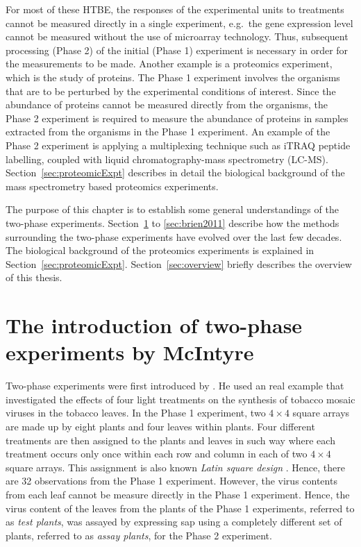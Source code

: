 \documentclass[11pt,a4paper]{article}
\begin{document}

For most of these HTBE, the responses of the experimental units to treatments cannot be measured directly in a single experiment, e.g.\ the gene expression level cannot be measured without the use of microarray technology. Thus, subsequent processing (Phase 2) of the initial (Phase 1) experiment is necessary in order for the measurements to be made. Another example is a proteomics experiment, which is the study of proteins. The Phase 1 experiment involves the organisms that are to be perturbed by the experimental conditions of interest. Since the abundance of proteins cannot be measured directly from the organisms, the Phase 2 experiment is required to measure the abundance of proteins in samples extracted from the organisms in the Phase 1 experiment. An example of the Phase 2 experiment is applying a multiplexing technique such as iTRAQ peptide labelling, coupled with liquid chromatography-mass spectrometry (LC-MS). Section~\ref{sec:proteomicExpt} describes in detail the biological background of the mass spectrometry based proteomics experiments. 

The purpose of this chapter is to establish some general understandings of the two-phase experiments. Section~\ref{sec:introTwoPhase} to \ref{sec:brien2011} describe how the methods surrounding the two-phase experiments have evolved over the last few decades. The biological background of the proteomics experiments is explained in Section~\ref{sec:proteomicExpt}. Section~\ref{sec:overview} briefly describes the overview of this thesis.


\section{The introduction of two-phase experiments by McIntyre}
\label{sec:introTwoPhase}
Two-phase experiments were first introduced by \cite{McIntyre1955}. He used an real example that investigated the effects of four light treatments on the synthesis of tobacco mosaic viruses in the tobacco leaves. In the Phase 1 experiment, two $4 \times 4$ square arrays are made up by eight plants and four leaves within plants. Four different treatments are then assigned to the plants and leaves in such way where each treatment occurs only once within each row and column in each of two $4 \times 4$ square arrays. This assignment is also known \emph{Latin square design} \citep{Bailey2008}. Hence, there are 32 observations from the Phase 1 experiment. However, the virus contents from each leaf cannot be measure directly in the Phase 1 experiment. Hence, the virus content of the leaves from the plants of the Phase 1 experiments, referred to as \emph{test plants}, was assayed by expressing sap using a completely different set of plants, referred to as \emph{assay plants}, for the Phase 2 experiment. 
\end{document}
